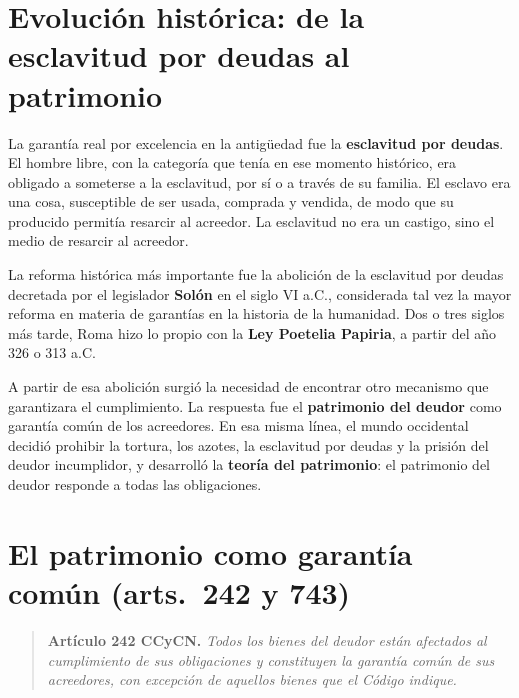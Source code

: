 \documentclass[12pt,oneside]{book}
\begin{document}
\section{Evolución histórica: de la esclavitud por deudas al patrimonio}

La garantía real por excelencia en la antigüedad fue la \textbf{esclavitud por deudas}. El hombre libre, con la categoría que tenía en ese momento histórico, era obligado a someterse a la esclavitud, por sí o a través de su familia. El esclavo era una cosa, susceptible de ser usada, comprada y vendida, de modo que su producido permitía resarcir al acreedor. La esclavitud no era un castigo, sino el medio de resarcir al acreedor.

La reforma histórica más importante fue la abolición de la esclavitud por deudas decretada por el legislador \textbf{Solón} en el siglo VI a.C., considerada tal vez la mayor reforma en materia de garantías en la historia de la humanidad. Dos o tres siglos más tarde, Roma hizo lo propio con la \textbf{Ley Poetelia Papiria}, a partir del año 326 o 313 a.C.

A partir de esa abolición surgió la necesidad de encontrar otro mecanismo que garantizara el cumplimiento. La respuesta fue el \textbf{patrimonio del deudor} como garantía común de los acreedores. En esa misma línea, el mundo occidental decidió prohibir la tortura, los azotes, la esclavitud por deudas y la prisión del deudor incumplidor, y desarrolló la \textbf{teoría del patrimonio}: el patrimonio del deudor responde a todas las obligaciones.

\section{El patrimonio como garantía común (arts.~242 y 743)}

\begin{quote}
\textbf{Artículo 242 CCyCN.} \textit{Todos los bienes del deudor están afectados al cumplimiento de sus obligaciones y constituyen la garantía común de sus acreedores, con excepción de aquellos bienes que el Código indique.}
\end{quote}
\end{document}
